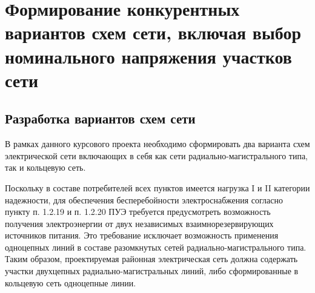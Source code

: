 \chapter{Формирование конкурентных вариантов схем сети, включая выбор номинального напряжения участков сети}
\label{cha:var_scheme}

\section{Разработка вариантов схем сети}

В рамках данного курсового проекта необходимо сформировать два варианта схем электрической сети включающих в себя как сети радиально-магистрального типа, так и кольцевую сеть.

Поскольку в составе потребителей всех пунктов имеется нагрузка I и II категории надежности, для обеспечения бесперебойности электроснабжения согласно пункту п. 1.2.19 и п. 1.2.20 ПУЭ \cite{пуэ7} требуется предусмотреть возможность получения электроэнергии от двух независимых взаимнорезервирующих источников питания. Это требование исключает возможность применения одноцепных линий в составе разомкнутых сетей радиально-магистрального типа. Таким образом, проектируемая районная электрическая сеть должна содержать участки двухцепных радиально-магистральных линий, либо сформированные в кольцевую сеть одноцепные линии.

